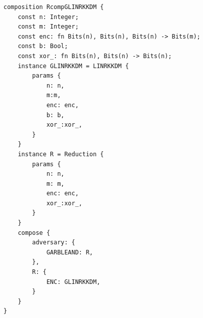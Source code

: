 \begin{longlisting}
\begin{verbatim}
composition RcompGLINRKKDM {
    const n: Integer; 
    const m: Integer;  
    const enc: fn Bits(n), Bits(n), Bits(n) -> Bits(m); 
    const b: Bool; 
    const xor_: fn Bits(n), Bits(n) -> Bits(n);
    instance GLINRKKDM = LINRKKDM {
        params {
            n: n,
            m:m,
            enc: enc,
            b: b,
            xor_:xor_,
        }
    }
    instance R = Reduction {
        params {
            n: n,
            m: m,
            enc: enc,
            xor_:xor_,
        }
    }
    compose {
        adversary: {
            GARBLEAND: R,
        },
        R: {
            ENC: GLINRKKDM,
        }
    }
}
\end{verbatim}
\caption{Composition }
\label{lst:domino-composition-rcompglinrkkdm}
\end{longlisting}
